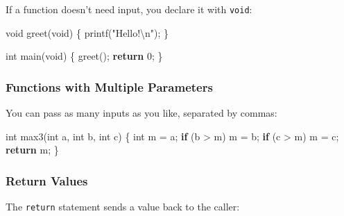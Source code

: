 \documentclass[
  letterpaper,
  DIV=11,
  numbers=noendperiod]{scrreprt}
\newenvironment{Shaded}{\begin{snugshade}}{\end{snugshade}}
\newcommand{\ControlFlowTok}[1]{\textcolor[rgb]{0.00,0.23,0.31}{\textbf{#1}}}
\newcommand{\DataTypeTok}[1]{\textcolor[rgb]{0.68,0.00,0.00}{#1}}
\newcommand{\DecValTok}[1]{\textcolor[rgb]{0.68,0.00,0.00}{#1}}
\newcommand{\NormalTok}[1]{\textcolor[rgb]{0.00,0.23,0.31}{#1}}
\newcommand{\OperatorTok}[1]{\textcolor[rgb]{0.37,0.37,0.37}{#1}}
\newcommand{\SpecialCharTok}[1]{\textcolor[rgb]{0.37,0.37,0.37}{#1}}
\newcommand{\StringTok}[1]{\textcolor[rgb]{0.13,0.47,0.30}{#1}}
\begin{document}
If a function doesn't need input, you declare it with \texttt{void}:

\begin{Shaded}
\begin{Highlighting}[]
\DataTypeTok{void}\NormalTok{ greet}\OperatorTok{(}\DataTypeTok{void}\OperatorTok{)} \OperatorTok{\{}
\NormalTok{    printf}\OperatorTok{(}\StringTok{"Hello!}\SpecialCharTok{\textbackslash{}n}\StringTok{"}\OperatorTok{);}
\OperatorTok{\}}

\DataTypeTok{int}\NormalTok{ main}\OperatorTok{(}\DataTypeTok{void}\OperatorTok{)} \OperatorTok{\{}
\NormalTok{    greet}\OperatorTok{();}
    \ControlFlowTok{return} \DecValTok{0}\OperatorTok{;}
\OperatorTok{\}}
\end{Highlighting}
\end{Shaded}

\subsubsection{Functions with Multiple
Parameters}\label{functions-with-multiple-parameters}

You can pass as many inputs as you like, separated by commas:

\begin{Shaded}
\begin{Highlighting}[]
\DataTypeTok{int}\NormalTok{ max3}\OperatorTok{(}\DataTypeTok{int}\NormalTok{ a}\OperatorTok{,} \DataTypeTok{int}\NormalTok{ b}\OperatorTok{,} \DataTypeTok{int}\NormalTok{ c}\OperatorTok{)} \OperatorTok{\{}
    \DataTypeTok{int}\NormalTok{ m }\OperatorTok{=}\NormalTok{ a}\OperatorTok{;}
    \ControlFlowTok{if} \OperatorTok{(}\NormalTok{b }\OperatorTok{\textgreater{}}\NormalTok{ m}\OperatorTok{)}\NormalTok{ m }\OperatorTok{=}\NormalTok{ b}\OperatorTok{;}
    \ControlFlowTok{if} \OperatorTok{(}\NormalTok{c }\OperatorTok{\textgreater{}}\NormalTok{ m}\OperatorTok{)}\NormalTok{ m }\OperatorTok{=}\NormalTok{ c}\OperatorTok{;}
    \ControlFlowTok{return}\NormalTok{ m}\OperatorTok{;}
\OperatorTok{\}}
\end{Highlighting}
\end{Shaded}

\subsubsection{Return Values}\label{return-values}

The \texttt{return} statement sends a value back to the caller:
\end{document}
